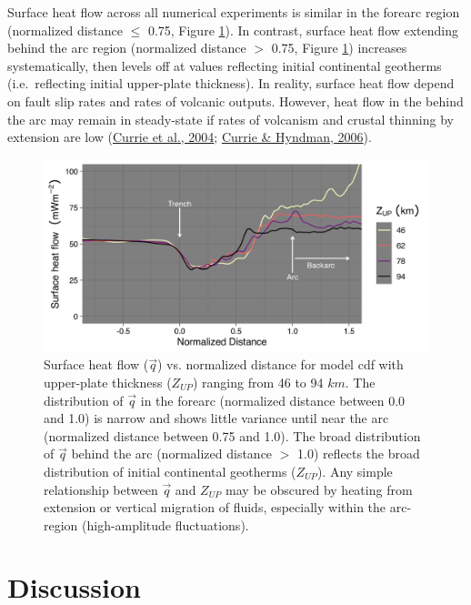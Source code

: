 Surface heat flow across all numerical experiments is similar in the forearc region (normalized distance \(\leq\) 0.75, Figure \ref{fig:hf78}). In contrast, surface heat flow extending behind the arc region (normalized distance \(>\) 0.75, Figure \ref{fig:hf78}) increases systematically, then levels off at values reflecting initial continental geotherms (i.e.~reflecting initial upper-plate thickness). In reality, surface heat flow depend on fault slip rates and rates of volcanic outputs. However, heat flow in the behind the arc may remain in steady-state if rates of volcanism and crustal thinning by extension are low (\protect\hyperlink{ref-currie2004}{Currie et al., 2004}; \protect\hyperlink{ref-currie2006}{Currie \& Hyndman, 2006}).

\begin{figure}[htbp]

{\centering \includegraphics[width=1\linewidth,]{assets/figs/chpt2/fig5} 

}

\caption[Surface heat flow calculated from numerical experiments]{Surface heat flow ($\vec{q}$) vs. normalized distance for model cdf with upper-plate thickness ($Z_{UP}$) ranging from 46 to 94 $km$. The distribution of $\vec{q}$ in the forearc (normalized distance between 0.0 and 1.0) is narrow and shows little variance until near the arc (normalized distance between 0.75 and 1.0). The broad distribution of $\vec{q}$ behind the arc (normalized distance $>$ 1.0) reflects the broad distribution of initial continental geotherms ($Z_{UP}$). Any simple relationship between $\vec{q}$ and $Z_{UP}$ may be obscured by heating from extension or vertical migration of fluids, especially within the arc-region (high-amplitude fluctuations).}\label{fig:hf78}
\end{figure}

\hypertarget{chpt2Discussion}{%
\section{Discussion}\label{chpt2Discussion}}

